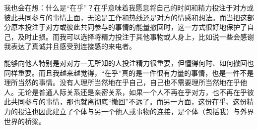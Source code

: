 我也会在想：什么是“在乎”？在乎意味着我愿意将自己的时间和精力投注于对方或彼此共同参与的事情上面，无论是工作和热线还是对方的情感和想法。而当把这部分原本投注于对方或彼此共同参与的事情的能量撤回时，这一方式很好地保护了自己，及时止损。而我可以选择将精力投注于其他事物或人身上，比如说一些会感谢我表达了真诚并且感受到连接感的来电者。

能够向他人\pozhehao{}特别是对对方一无所知的人\pozhehao{}投注精力很重要，但懂得何时、如何撤回也同样重要。而且我越来越觉得，“在乎”真的是一件很有力量的事情，也是一件不是理所当然的事情。没有人理所当然地在乎自己，自己也不需要理所当然地在乎他人。无论是普通人际关系还是亲密关系，如果一个人不再在乎对方，也不再在乎彼此共同参与的事情，那也就离彻底“撤回”不远了。而另一方面，这份在乎、这份精力的投注也因此建立了个体与另一个他人或事物的连接，是个体（包括我）与外界世界的桥梁。

